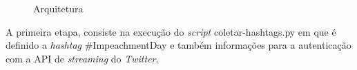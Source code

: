 \begin{figure}[h]
	\centering
	\vspace{0.1cm}
	\caption{Arquitetura}
	\label{arquitetura}
\end{figure}

A primeira etapa, consiste na execução do \textit{script} coletar-hashtags.py em que é definido a \textit{hashtag} \#ImpeachmentDay e também informações para a autenticação com a API de \textit{streaming} do \textit{Twitter}.
























